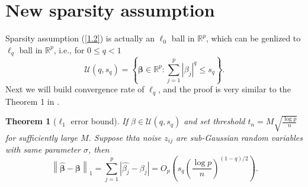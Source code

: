 \documentclass[12pt]{article}
\numberwithin{equation}{section}
\newtheorem{theorem}{Theorem}[section]
\begin{document}
\section{New sparsity assumption}
Sparsity assumption (\ref{1.2}) is actually an $\ell_0$ ball in $\mathbb{R}^p$, which can be genlized to $\ell_q$ ball in $\mathbb{R}^p$, i.e., for $0\leq q<1$
\begin{equation}
\mathcal{U}\left(q,s_q\right)=\left\{\boldsymbol{\beta}\in \mathbb{R}^p:\sum_{j=1}^p|\beta_{j}|^q\leq s_q\right\}.
\end{equation}
Next we will build convergence rate of $\ell_q$, and the proof is very similar to the Theorem 1 in \citet{Bickel2008thres}.
\begin{theorem}[$\ell_1$ error bound]
	If $\beta\in \mathcal{U}\left(q,s_q\right)$ and set threshold $t_n=M\sqrt{\frac{\log p}{n}}$ for sufficiently large $M$. Suppose thta noise $z_{ij}$ are sub-Gaussian random variables with same parameter $\sigma$, then
	\begin{equation}\label{3.2}
	\left\|\boldsymbol{\widehat\beta}-\boldsymbol{\beta}\right\|_1=\sum_{j=1}^p|\widehat{\beta_j}-\beta_{j}|=O_p\left(s_q\left(\frac{\log p}{n}\right)^{(1-q)/2}\right).
	\end{equation}
\end{theorem}
\end{document}
